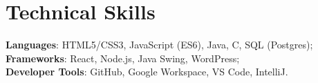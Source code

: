 \documentclass[letterpaper,11pt]{article}
\begin{document}
\section{Technical Skills}
 \begin{itemize}[leftmargin=0.15in, label={}]
    \small{\item{
     \textbf{Languages}{: HTML5/CSS3, JavaScript (ES6), Java, C, SQL (Postgres);} \\
     \textbf{Frameworks}{: React, Node.js, Java Swing, WordPress;} \\
     \textbf{Developer Tools}{: GitHub, Google Workspace, VS Code, IntelliJ.} \\
     }}
 \end{itemize}

\end{document}
